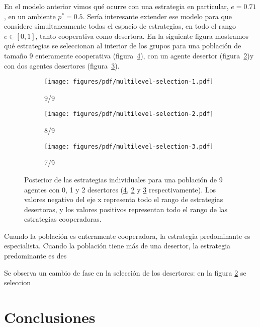\documentclass[a4paper,10pt]{article}
\begin{document}

En el modelo anterior vimos qué ocurre con una estrategia en particular, $e = 0.71$, en un ambiente $p^* = 0.5$.
Sería interesante extender ese modelo para que considere simultaneamente todas el espacio de estrategias, en todo el rango $e\in[0,1]$, tanto cooperativa como desertora.
En la siguiente figura mostramos qué estrategias se seleccionan al interior de los grupos para una población de tamaño 9 enteramente cooperativa (figura~\ref{fig:multilevel-selection-1}), con un agente desertor (figura~\ref{fig:multilevel-selection-2})y con dos agentes desertores (figura~\ref{fig:multilevel-selection-3}).
%
\begin{figure}[H]
    \centering
    \begin{subfigure}[b]{0.32\textwidth}
    \texttt{[image: figures/pdf/multilevel-selection-1.pdf]}
    \caption{9/9}
    \label{fig:multilevel-selection-1}
    \end{subfigure}
    \begin{subfigure}[b]{0.32\textwidth}
    \texttt{[image: figures/pdf/multilevel-selection-2.pdf]}
    \caption{8/9}
    \label{fig:multilevel-selection-2}
    \end{subfigure}
    \begin{subfigure}[b]{0.32\textwidth}
    \texttt{[image: figures/pdf/multilevel-selection-3.pdf]}
    \caption{7/9}
    \label{fig:multilevel-selection-3}
    \end{subfigure}
    \caption{
    Posterior de las estrategias individuales para una población de 9 agentes con 0, 1 y 2 desertores (\ref{fig:multilevel-selection-1}, \ref{fig:multilevel-selection-2} y \ref{fig:multilevel-selection-3} respectivamente).
    Los valores negativo del eje x representa todo el rango de estrategias desertoras, y los valores positivos representan todo el rango de las estrategias cooperadoras.
    }
    \label{fig:multilevel-selection-1}
\end{figure}
%
Cuando la población es enteramente cooperadora, la estrategia predominante es especialista.
Cuando la población tiene más de una desertor, la estrategia predominante es des

Se observa un cambio de fase en la selección de los desertores: en la figura \ref{fig:multilevel-selection-2} se seleccion
    

\section{Conclusiones}
\end{document}
